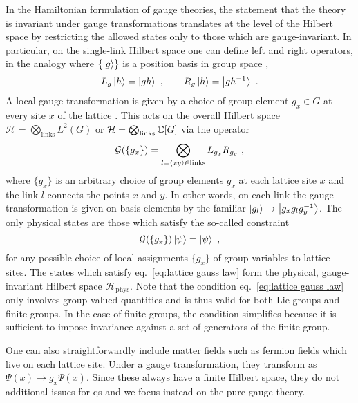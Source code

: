 In the Hamiltonian formulation of gauge theories, the statement that the theory is invariant under gauge transformations translates at the level of the Hilbert space by restricting the allowed states only to those which are gauge-invariant.
In particular, on the single-link Hilbert space one can define left and right  operators, in the analogy where $\{\ket{g}\}$ is a position basis in group space \cite{ZoharBurrello},
\begin{equation}
    \label{eq:regular representations}
    L_g \ket{h} = \ket{gh} \ , \quad \quad R_g \ket{h} = \ket{gh^{-1}} \ .
\end{equation}
A local gauge transformation is given by a choice of group element $g_x \in G$ at every site $x$ of the lattice \cite{Osborne}.
This acts on the overall Hilbert space $\mathcal{H} = \bigotimes_{\mathrm{links}} L^2(G)$ or $\mathcal{H} = \bigotimes_{\mathrm{links}} \mathbb{C}[G]$ via the operator
\begin{equation}
    \label{eq:gauss law operator}
    \mathcal{G}(\{g_x\}) = \bigotimes_{l=\expval{xy} \in \mathrm{links}} L_{g_{x}} R_{g_y} \ ,
\end{equation}
where $\{g_x\}$ is an arbitrary choice of group elements $g_x$ at each lattice site $x$ and the link $l$ connects the points $x$ and $y$.
In other words, on each link the gauge transformation is given on basis elements by the familiar $\ket{g_l} \to \ket{g_x g_l g_y^{-1}}$.
The only physical states are those which satisfy the so-called  constraint \cite{KogSuss, Osborne, Tong}
\begin{equation}
    \label{eq:lattice gauss law}
    \mathcal{G}(\{g_x\}) \ket{\psi}=\ket{\psi} \ ,
\end{equation}
for any possible choice of local assignments $\{g_x\}$ of group variables to lattice sites.
The states which satisfy eq.~\eqref{eq:lattice gauss law} form the physical, gauge-invariant Hilbert space $\mathcal{H}_\mathrm{phys}$.
Note that the condition eq.~\eqref{eq:lattice gauss law} only involves group-valued quantities and is thus valid for both Lie groups and finite groups.
In the case of finite groups, the condition simplifies because it is sufficient to impose invariance against a set of generators of the finite group.

One can also straightforwardly include matter fields such as fermion fields which live on each lattice site.
Under a gauge transformation, they transform as $\Psi(x) \to g_x \Psi(x)$.
Since these always have a finite Hilbert space, they do not additional issues for \ac{qs} and we focus instead on the pure gauge theory.


